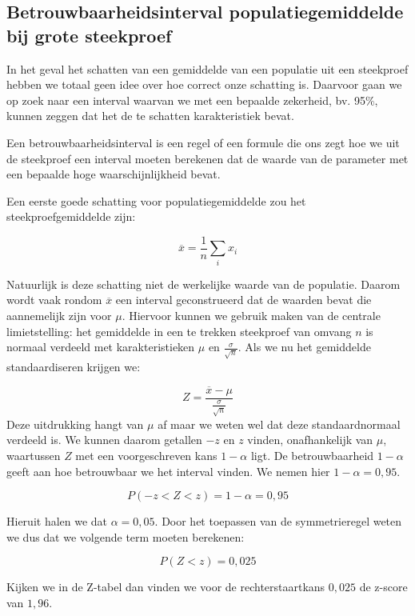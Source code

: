 {\subsection{Betrouwbaarheidsinterval populatiegemiddelde bij grote steekproef}

In het geval het schatten van een gemiddelde van een populatie uit een steekproef hebben we totaal geen idee over hoe correct onze schatting is. Daarvoor gaan we op zoek naar een interval waarvan we met een bepaalde zekerheid, bv. 95\%, kunnen zeggen dat het de te schatten karakteristiek bevat.

\begin{definition}[Betrouwbaarheidsinterval]
Een betrouwbaarheidsinterval is een regel of een formule die ons zegt hoe we uit de steekproef een interval moeten berekenen dat de waarde van de parameter met een bepaalde hoge waarschijnlijkheid bevat.
\end{definition}

Een eerste goede schatting voor populatiegemiddelde zou het steekproefgemiddelde zijn:

\[ \overline{x} = \frac{1}{n} \sum_{i} x_{i} \]

Natuurlijk is deze schatting niet de werkelijke waarde van de populatie. Daarom wordt vaak rondom $\overline{x}$ een interval geconstrueerd dat de waarden bevat die aannemelijk zijn voor $\mu$. Hiervoor kunnen we gebruik maken van de centrale limietstelling: het gemiddelde in een te trekken steekproef van omvang $n$ is normaal verdeeld met karakteristieken $\mu$ en $\frac{\sigma}{\sqrt{n}}$.  Als we nu het gemiddelde standaardiseren krijgen we:

\[ Z = \frac{\overline{x} - \mu}{\frac{\sigma}{\sqrt{n}}} \]
 Deze uitdrukking hangt van $\mu$ af maar we weten wel dat deze standaardnormaal verdeeld is. We kunnen daarom getallen $-z$ en $z$ vinden, onafhankelijk van $\mu$, waartussen $Z$ met een voorgeschreven kans $1 - \alpha$ ligt. De betrouwbaarheid $1 - \alpha$ geeft aan hoe betrouwbaar we het interval vinden. We nemen hier $1 - \alpha= 0,95$.

\[P(-z < Z < z) = 1 - \alpha = 0,95 \]

Hieruit halen we dat $\alpha = 0,05$. Door het toepassen van de symmetrieregel weten we dus dat we volgende term moeten berekenen:

\[ P( Z < z) = 0,025 \]

Kijken we in de Z-tabel dan vinden we voor de rechterstaartkans $0,025$ de z-score van $1,96$.

}
